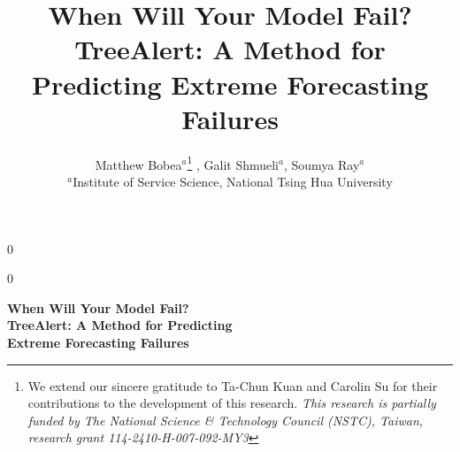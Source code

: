 \documentclass[12pt]{article}
\newcommand{\blind}{0}
\begin{document}
%

\def\spacingset#1{\renewcommand{\baselinestretch}%
{#1}\small\normalsize} \spacingset{1}


\blind
{
  \title{When Will Your Model Fail?\\TreeAlert: A Method for Predicting Extreme Forecasting Failures}
  \author{Matthew Bobea$^{a}$\thanks{We extend our sincere gratitude to Ta-Chun Kuan and Carolin Su for their contributions to the development of this research. \textit{This research is partially funded by The National Science \& Technology Council (NSTC), Taiwan, research grant 114-2410-H-007-092-MY3}}%
    , Galit Shmueli$^{a}$, %
    Soumya Ray$^{a}$ \\[6pt]
    $^{a}$Institute of Service Science, National Tsing Hua University}
  \maketitle
} \fi
{}\blind
{
  \bigskip
  \bigskip
  \bigskip
  \begin{center}
    {\LARGE\bf When Will Your Model Fail?}\\[10pt]
    {\LARGE\bf TreeAlert: A Method for Predicting}\\[10pt] 
    {\LARGE\bf Extreme Forecasting Failures}
  \end{center}
  \medskip
} \fi
\end{document}
